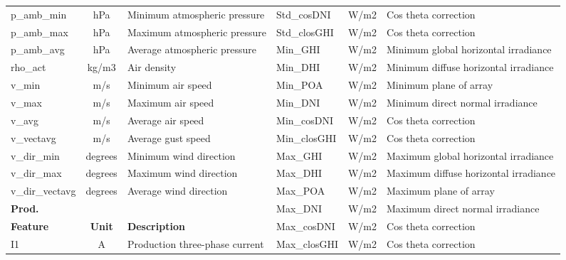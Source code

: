 \begin{table}[htbp]
\begin{tabular}{lcl|rrr}
    p\_amb\_min & hPa & Minimum atmospheric pressure & \multicolumn{1}{l}{Std\_cosDNI} & \multicolumn{1}{c}{W/m2} & \multicolumn{1}{l}{Cos theta correction} \\
    p\_amb\_max & hPa & Maximum atmospheric pressure & \multicolumn{1}{l}{Std\_closGHI} & \multicolumn{1}{c}{W/m2} & \multicolumn{1}{l}{Cos theta correction} \\
    p\_amb\_avg & hPa & Average atmospheric pressure & \multicolumn{1}{l}{Min\_GHI} & \multicolumn{1}{c}{W/m2} & \multicolumn{1}{l}{Minimum global horizontal irradiance} \\
    rho\_act & kg/m3 & Air density & \multicolumn{1}{l}{Min\_DHI} & \multicolumn{1}{c}{W/m2} & \multicolumn{1}{l}{Minimum diffuse horizontal irradiance} \\
    v\_min & m/s & Minimum air speed & \multicolumn{1}{l}{Min\_POA} & \multicolumn{1}{c}{W/m2} & \multicolumn{1}{l}{Minimum plane of array} \\
    v\_max & m/s & Maximum air speed & \multicolumn{1}{l}{Min\_DNI} & \multicolumn{1}{c}{W/m2} & \multicolumn{1}{l}{Minimum direct normal irradiance} \\
    v\_avg & m/s & Average air speed & \multicolumn{1}{l}{Min\_cosDNI} & \multicolumn{1}{c}{W/m2} & \multicolumn{1}{l}{Cos theta correction} \\
    v\_vectavg & m/s & Average gust speed & \multicolumn{1}{l}{Min\_closGHI} & \multicolumn{1}{c}{W/m2} & \multicolumn{1}{l}{Cos theta correction} \\
    v\_dir\_min & degrees & Minimum wind direction & \multicolumn{1}{l}{Max\_GHI} & \multicolumn{1}{c}{W/m2} & \multicolumn{1}{l}{Maximum global horizontal irradiance} \\
    v\_dir\_max & degrees & Maximum wind direction & \multicolumn{1}{l}{Max\_DHI} & \multicolumn{1}{c}{W/m2} & \multicolumn{1}{l}{Maximum diffuse horizontal irradiance} \\
    v\_dir\_vectavg & degrees & Average wind direction & \multicolumn{1}{l}{Max\_POA} & \multicolumn{1}{c}{W/m2} & \multicolumn{1}{l}{Maximum plane of array} \\
\cmidrule{1-3}    \textbf{Prod.} &   &   & \multicolumn{1}{l}{Max\_DNI} & \multicolumn{1}{c}{W/m2} & \multicolumn{1}{l}{Maximum direct normal irradiance} \\
    \textbf{Feature} & \textbf{Unit} & \textbf{Description} & \multicolumn{1}{l}{Max\_cosDNI} & \multicolumn{1}{c}{W/m2} & \multicolumn{1}{l}{Cos theta correction} \\
\cmidrule{1-3}    I1 & A & Production three-phase current & \multicolumn{1}{l}{Max\_closGHI} & \multicolumn{1}{c}{W/m2} & \multicolumn{1}{l}{Cos theta correction} \\

\end{tabular}
\end{table}
